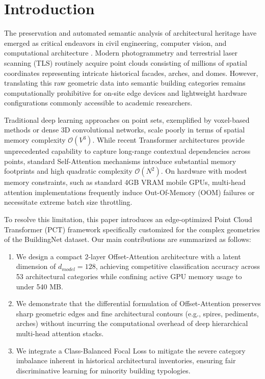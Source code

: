 \section{Introduction}
\label{sec:introduction}

The preservation and automated semantic analysis of architectural heritage have emerged as critical endeavors in civil engineering, computer vision, and computational architecture \cite{buildingnet2021}. Modern photogrammetry and terrestrial laser scanning (TLS) routinely acquire point clouds consisting of millions of spatial coordinates representing intricate historical facades, arches, and domes. However, translating this raw geometric data into semantic building categories remains computationally prohibitive for on-site edge devices and lightweight hardware configurations commonly accessible to academic researchers.

Traditional deep learning approaches on point sets, exemplified by voxel-based methods or dense 3D convolutional networks, scale poorly in terms of spatial memory complexity $\mathcal{O}(V^3)$. While recent Transformer architectures provide unprecedented capability to capture long-range contextual dependencies across points, standard Self-Attention mechanisms introduce substantial memory footprints and high quadratic complexity $\mathcal{O}(N^2)$. On hardware with modest memory constraints, such as standard 4GB VRAM mobile GPUs, multi-head attention implementations frequently induce Out-Of-Memory (OOM) failures or necessitate extreme batch size throttling.

To resolve this limitation, this paper introduces an edge-optimized Point Cloud Transformer (PCT) framework specifically customized for the complex geometries of the BuildingNet dataset. Our main contributions are summarized as follows:
\begin{enumerate}
    \item We design a compact 2-layer Offset-Attention architecture with a latent dimension of $d_{model} = 128$, achieving competitive classification accuracy across 53 architectural categories while confining active GPU memory usage to under 540 MB.
    \item We demonstrate that the differential formulation of Offset-Attention preserves sharp geometric edges and fine architectural contours (e.g., spires, pediments, arches) without incurring the computational overhead of deep hierarchical multi-head attention stacks.
    \item We integrate a Class-Balanced Focal Loss to mitigate the severe category imbalance inherent in historical architectural inventories, ensuring fair discriminative learning for minority building typologies.
\end{enumerate}
